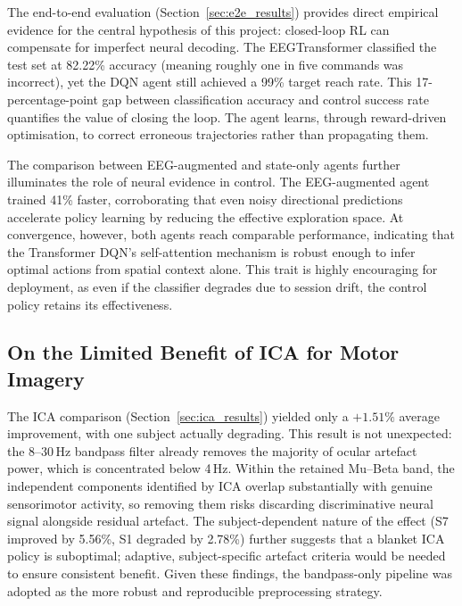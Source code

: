 \documentclass[12pt, a4paper]{article}
\begin{document}
The end-to-end evaluation (Section~\ref{sec:e2e_results}) provides direct empirical evidence for the central hypothesis of this project: closed-loop RL can compensate for imperfect neural decoding. The EEGTransformer classified the test set at 82.22\% accuracy (meaning roughly one in five commands was incorrect), yet the DQN agent still achieved a 99\% target reach rate. This 17-percentage-point gap between classification accuracy and control success rate quantifies the value of closing the loop. The agent learns, through reward-driven optimisation, to correct erroneous trajectories rather than propagating them.

The comparison between EEG-augmented and state-only agents further illuminates the role of neural evidence in control. The EEG-augmented agent trained 41\% faster, corroborating that even noisy directional predictions accelerate policy learning by reducing the effective exploration space. At convergence, however, both agents reach comparable performance, indicating that the Transformer DQN's self-attention mechanism is robust enough to infer optimal actions from spatial context alone. This trait is highly encouraging for deployment, as even if the classifier degrades due to session drift, the control policy retains its effectiveness.

\subsection{On the Limited Benefit of ICA for Motor Imagery}

The ICA comparison (Section~\ref{sec:ica_results}) yielded only a $+1.51\%$ average improvement, with one subject actually degrading. This result is not unexpected: the 8--30\,Hz bandpass filter already removes the majority of ocular artefact power, which is concentrated below 4\,Hz. Within the retained Mu--Beta band, the independent components identified by ICA overlap substantially with genuine sensorimotor activity, so removing them risks discarding discriminative neural signal alongside residual artefact. The subject-dependent nature of the effect (S7 improved by 5.56\%, S1 degraded by 2.78\%) further suggests that a blanket ICA policy is suboptimal; adaptive, subject-specific artefact criteria would be needed to ensure consistent benefit. Given these findings, the bandpass-only pipeline was adopted as the more robust and reproducible preprocessing strategy.
\end{document}
